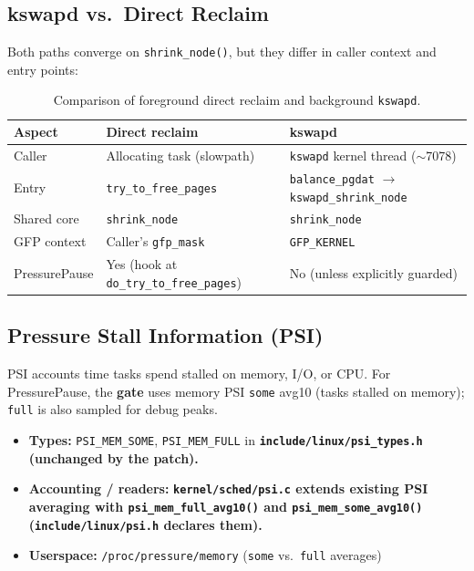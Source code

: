\documentclass[12pt,a4paper]{article}
\newcommand{\srcfile}[1]{\begingroup\bfseries\color{aublue}\nolinkurl{#1}\endgroup}
\begin{document}
\subsection{kswapd vs.\ Direct Reclaim}

Both paths converge on \texttt{shrink\_node()}, but they differ in caller context and entry points:

\begin{table}[H]
\centering
\begin{tabular}{@{}p{3.2cm}p{5.2cm}p{5.2cm}@{}}
\toprule
\textbf{Aspect} & \textbf{Direct reclaim} & \textbf{kswapd} \\
\midrule
Caller & Allocating task (slowpath) & \texttt{kswapd} kernel thread ($\sim$7078) \\
Entry & \texttt{try\_to\_free\_pages} & \texttt{balance\_pgdat} $\rightarrow$ \texttt{kswapd\_shrink\_node} \\
Shared core & \texttt{shrink\_node} & \texttt{shrink\_node} \\
GFP context & Caller's \texttt{gfp\_mask} & \texttt{GFP\_KERNEL} \\
PressurePause & Yes (hook at \texttt{do\_try\_to\_free\_pages}) & No (unless explicitly guarded) \\
\bottomrule
\end{tabular}
\caption{Comparison of foreground direct reclaim and background \texttt{kswapd}.}
\end{table}

\subsection{Pressure Stall Information (PSI)}

PSI accounts time tasks spend stalled on memory, I/O, or CPU. For PressurePause, the \textbf{gate} uses memory PSI \texttt{some} avg10 (tasks stalled on memory); \texttt{full} is also sampled for debug peaks.

\begin{itemize}[leftmargin=1.2cm]
    \item \textbf{Types:} \texttt{PSI\_MEM\_SOME}, \texttt{PSI\_MEM\_FULL} in \srcfile{include/linux/psi_types.h} (unchanged by the patch).
    \item \textbf{Accounting / readers:} \srcfile{kernel/sched/psi.c} extends existing PSI averaging with \texttt{psi\_mem\_full\_avg10()} and \texttt{psi\_mem\_some\_avg10()} (\srcfile{include/linux/psi.h} declares them).
    \item \textbf{Userspace:} \texttt{/proc/pressure/memory} (\texttt{some} vs.\ \texttt{full} averages)
\end{itemize}
\end{document}
